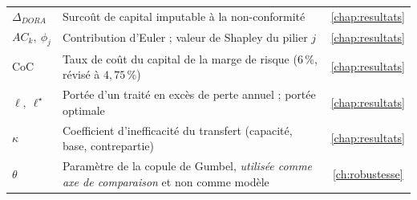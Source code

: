 {\begin{longtable}{>{\raggedright}p{3.3cm} >{\raggedright\arraybackslash}p{10.2cm} c}
$\Delta_{DORA}$ & Surcoût de capital imputable à la non-conformité & \ref{chap:resultats} \\
$AC_k,\ \phi_j$ & Contribution d'Euler ; valeur de Shapley du pilier $j$ & \ref{chap:resultats} \\
$\mathrm{CoC}$ & Taux de coût du capital de la marge de risque ($6\,\%$, révisé à $4{,}75\,\%$) & \ref{chap:resultats} \\
$\ell,\ \ell^\star$ & Portée d'un traité en excès de perte annuel ; portée optimale & \ref{chap:resultats} \\
$\kappa$ & Coefficient d'inefficacité du transfert (capacité, base, contrepartie) & \ref{chap:resultats} \\
$\theta$ & Paramètre de la copule de Gumbel, \emph{utilisée comme axe de comparaison} et non comme modèle & \ref{ch:robustesse} \\
\end{longtable}
}

\clearpage


